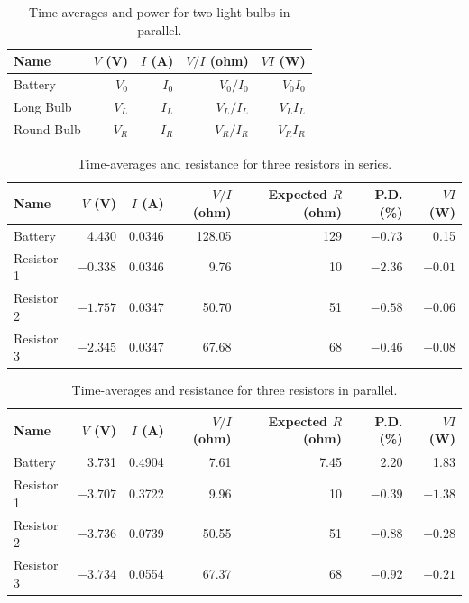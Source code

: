 \begin{table}[ht]
	\begin{center}
		\begin{tabular}{|l|r|r|r|r|}
			\hline
			Name & $V$ (V) & $I$ (A) & $V/I$ (ohm) & $V I$ (W) \\
			\hline
			Battery & $V_{0}$ & $I_{0}$ & $V_{0} / I_{0}$ & $V_{0} I_{0}$ \\
			Long Bulb & $V_{L}$ & $I_{L}$ & $V_{L} / I_{L}$ & $V_{L} I_{L}$ \\
			Round Bulb & $V_{R}$ & $I_{R}$ & $V_{R} / I_{R}$ & $V_{R} I_{R}$ \\
			\hline
		\end{tabular}
	\end{center}
	\caption{Time-averages and power for two light bulbs in parallel.}
	\label{table.03.bulbs.parallel}
\end{table}
\begin{table}[ht]
	\begin{center}
		\begin{tabular}{|l|r|r|r|r|r|r|}
			\hline
			Name & $V$ (V) & $I$ (A) & $V/I$ (ohm) & Expected $R$ (ohm) & P.D. (\%) & $V I$ (W) \\
			\hline
			Battery & 4.430 & 0.0346 & 128.05 & 129 & $-0.73$ & 0.15 \\
			Resistor 1 & $-0.338$ & 0.0346 & 9.76 & 10 & $-2.36$ & $-0.01$ \\
			Resistor 2 & $-1.757$ & 0.0347 & 50.70 & 51 & $-0.58$ & $-0.06$ \\
			Resistor 3 & $-2.345$ & 0.0347 & 67.68 & 68 & $-0.46$ & $-0.08$ \\
			\hline
		\end{tabular}
	\end{center}
	\caption{Time-averages and resistance for three resistors in series.}
	\label{table.03.3resistors.series}
\end{table}
\begin{table}[ht]
	\begin{center}
		\begin{tabular}{|l|r|r|r|r|r|r|}
			\hline
			Name & $V$ (V) & $I$ (A) & $V/I$ (ohm) & Expected $R$ (ohm) & P.D. (\%) & $V I$ (W) \\
			\hline
			Battery & 3.731 & 0.4904 & 7.61 & 7.45 & 2.20 & 1.83 \\
			Resistor 1 & $-3.707$ & 0.3722 & 9.96 & 10 & $-0.39$ & $-1.38$ \\
			Resistor 2 & $-3.736$ & 0.0739 & 50.55 & 51 & $-0.88$ & $-0.28$ \\
			Resistor 3 & $-3.734$ & 0.0554 & 67.37 & 68 & $-0.92$ & $-0.21$ \\
			\hline
		\end{tabular}
	\end{center}
	\caption{Time-averages and resistance for three resistors in parallel.}
	\label{table.03.3resistors.parallel}
\end{table}
\FloatBarrier
\newpage
